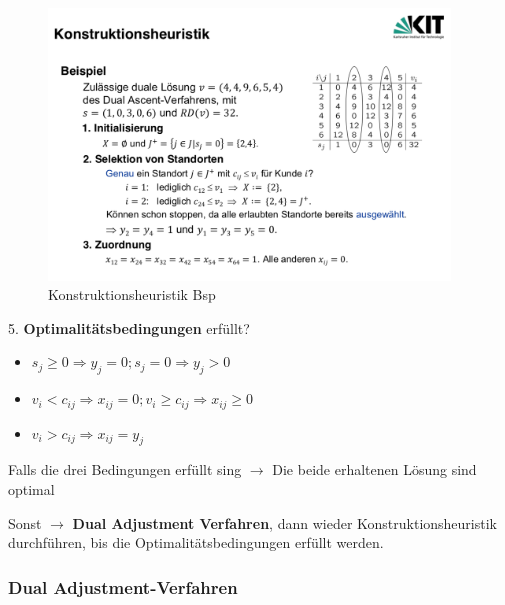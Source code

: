        \begin{exmp}
          
        \end{exmp}

        \begin{figure}[H]
          \centering
          \includegraphics[width=0.95\textwidth]{Images/Konstruktionsheuristik_Bsp.png}
          \caption{Konstruktionsheuristik Bsp}
          \label{fig:Konstruktionsheuristik_Bsp}
        \end{figure}
      

      \par 5. \textbf{Optimalitätsbedingungen} erfüllt?

      \begin{itemize}
        \item $s_j \geq 0 \Rightarrow y_j= 0; s_j=0 \Rightarrow y_j > 0$
        \item $v_i < c_{ij} \Rightarrow x_{ij} = 0; v_i \geq c_{ij} \Rightarrow x_{ij} \geq 0 $
        \item $v_i > c_{ij} \Rightarrow x_{ij} = y_j$
      \end{itemize}

      \par Falls die drei Bedingungen erfüllt sing $\rightarrow$ Die beide erhaltenen Lösung sind optimal
      \par Sonst $\rightarrow$ \textbf{Dual Adjustment Verfahren}, dann wieder Konstruktionsheuristik durchführen, bis die Optimalitätsbedingungen erfüllt werden. 
    

      \subsubsection{Dual Adjustment-Verfahren} %
      \label{ssub:dual_adjustment_verfahren}
      
